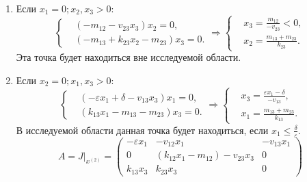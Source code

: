 \begin{enumerate}
        \item Если \( x_1 = 0; x_2, x_3 > 0 \):
            \[
                \left\{\begin{split}
                    & \left( -m_{12} - v_{23} x_3 \right) x_2 = 0, \\
                    & \left( -m_{13} + k_{23} x_2 - m_{23} \right) x_3 = 0. 
                \end{split}\right.
                \Rightarrow
                \left\{\begin{split}
                    & x_3 = \frac{ m_{12} }{ -v_{23} } < 0, \\
                    & x_2 = \frac{m_{13} + m_{23}}{k_{23}} . 
                \end{split}\right.
            \]
            Эта точка будет находиться вне исследуемой области.
        \item Если \( x_2 = 0; x_1, x_3 > 0 \):
            \[
                \left\{\begin{split}
                    & \left( -\varepsilon x_1 + \delta - v_{13} x_3 \right)x_1 = 0, \\
                    & \left( k_{13} x_1 -m_{13} - m_{23} \right)x_3 = 0. 
                \end{split}\right.
                \Rightarrow
                \left\{\begin{split}
                    & x_3 = \frac{ \varepsilon x_1 - \delta }{ -v_{13} }, \\
                    & x_1 = \frac{m_{13} + m_{23}}{k_{13}}. 
                \end{split}\right.
            \]
            В исследуемой области данная точка будет находиться, если \( x_1 \leq \frac{\delta}{\varepsilon} \).
            \[
                A = J \big|_{x^{(2)}} = \left(
                    \begin{matrix}
                        -\varepsilon x_1 & -v_{12}  x_1  & -v_{13} x_1 \\
                        0 & \left( k_{12} x_1 - m_{12} \right) - v_{23} x_3 & 0 \\
                        k_{13} x_3 & k_{23} x_3 & 0
                    \end{matrix}
                \right)
            \]
            

\end{enumerate}
